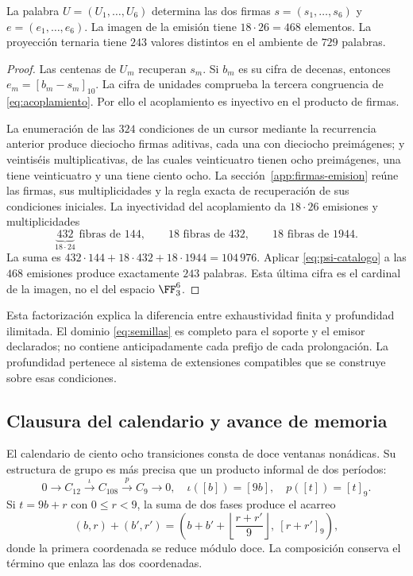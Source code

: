 \begin{proposition}
La palabra \(U=(U_1,\ldots,U_6)\) determina las dos firmas \(s=(s_1,\ldots,s_6)\) y \(e=(e_1,\ldots,e_6)\). La imagen de la emisión tiene \(18\cdot26=468\) elementos. La proyección ternaria tiene \(243\) valores distintos en el ambiente de \(729\) palabras.
\end{proposition}
\begin{proof}
Las centenas de \(U_m\) recuperan \(s_m\). Si \(b_m\) es su cifra de decenas, entonces \(e_m=[b_m-s_m]_{10}\). La cifra de unidades comprueba la tercera congruencia de \eqref{eq:acoplamiento}. Por ello el acoplamiento es inyectivo en el producto de firmas.

La enumeración de las \(324\) condiciones de un cursor mediante la recurrencia anterior produce dieciocho firmas aditivas, cada una con dieciocho preimágenes; y veintiséis multiplicativas, de las cuales veinticuatro tienen ocho preimágenes, una tiene veinticuatro y una tiene ciento ocho. La sección~\ref{app:firmas-emision} reúne las firmas, sus multiplicidades y la regla exacta de recuperación de sus condiciones iniciales. La inyectividad del acoplamiento da \(18\cdot26\) emisiones y multiplicidades
\[
 \underbrace{432}_{18\cdot24}\text{ fibras de }144,
 \qquad18\text{ fibras de }432,
 \qquad18\text{ fibras de }1944.
\]
La suma es \(432\cdot144+18\cdot432+18\cdot1944=104\,976\). Aplicar \eqref{eq:psi-catalogo} a las \(468\) emisiones produce exactamente \(243\) palabras. Esta última cifra es el cardinal de la imagen, no el del espacio \(\FF_3^6\).
\end{proof}

Esta factorización explica la diferencia entre exhaustividad finita y profundidad ilimitada. El dominio \eqref{eq:semillas} es completo para el soporte y el emisor declarados; no contiene anticipadamente cada prefijo de cada prolongación. La profundidad pertenece al sistema de extensiones compatibles que se construye sobre esas condiciones.

\subsection{Clausura del calendario y avance de memoria}

El calendario de ciento ocho transiciones consta de doce ventanas nonádicas. Su estructura de grupo es más precisa que un producto informal de dos períodos:
\begin{equation}
 0\longrightarrow C_{12}\xrightarrow{\iota}C_{108}
 \xrightarrow{p}C_9\longrightarrow0,
 \quad\iota([b])=[9b],\quad p([t])=[t]_9.
 \label{eq:extension108}
\end{equation}
Si \(t=9b+r\) con \(0\le r<9\), la suma de dos fases produce el acarreo
\[
 (b,r)+(b',r')=
 \left(b+b'+\left\lfloor\frac{r+r'}9\right\rfloor,\ [r+r']_9\right),
\]
donde la primera coordenada se reduce módulo doce. La composición conserva el término que enlaza las dos coordenadas.

